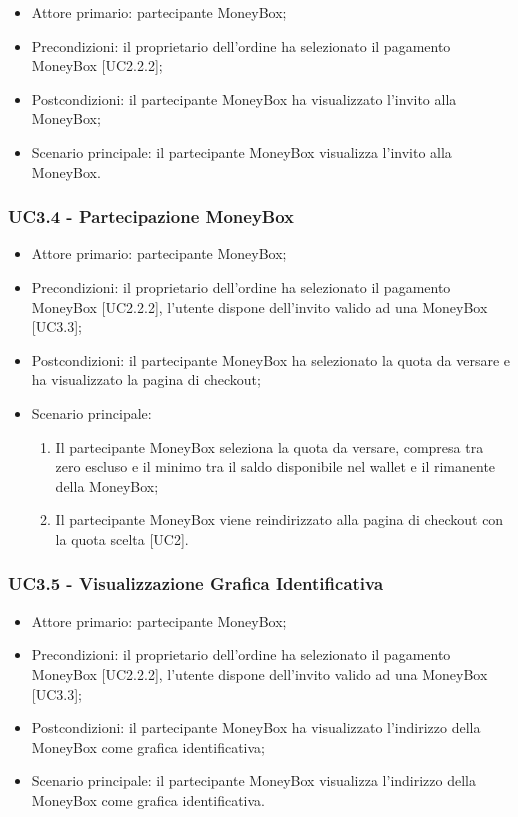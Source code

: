 \begin{itemize}
    \item Attore primario: partecipante MoneyBox\glo{};
    \item Precondizioni: il proprietario dell'ordine ha selezionato il pagamento MoneyBox\glo{} [UC2.2.2];
    \item Postcondizioni: il partecipante MoneyBox\glo{} ha visualizzato l'invito alla MoneyBox\glo{};
    \item Scenario principale: il partecipante MoneyBox\glo{} visualizza l'invito alla MoneyBox\glo{}.
\end{itemize}

\subsubsection{UC3.4 - Partecipazione MoneyBox}

\begin{itemize}
    \item Attore primario: partecipante MoneyBox\glo{};
    \item Precondizioni: il proprietario dell'ordine ha selezionato il pagamento MoneyBox\glo{} [UC2.2.2], 
            l'utente dispone dell'invito valido ad una MoneyBox\glo{} [UC3.3];
    \item Postcondizioni: il partecipante MoneyBox\glo{} ha selezionato la quota da versare e ha visualizzato la pagina di checkout;
    \item Scenario principale:
          \begin{enumerate}
              \item Il partecipante MoneyBox\glo{} seleziona la quota da versare, compresa tra zero escluso e il minimo tra il saldo disponibile nel wallet\glo{} 
                    e il rimanente della MoneyBox\glo{};
              \item Il partecipante MoneyBox\glo{} viene reindirizzato alla pagina di checkout con la quota scelta [UC2].
          \end{enumerate}
\end{itemize}

\subsubsection{UC3.5 - Visualizzazione Grafica Identificativa}

\begin{itemize}
    \item Attore primario: partecipante MoneyBox\glo{};
    \item Precondizioni: il proprietario dell'ordine ha selezionato il pagamento MoneyBox\glo{} [UC2.2.2], 
            l'utente dispone dell'invito valido ad una MoneyBox\glo{} [UC3.3];
    \item Postcondizioni: il partecipante MoneyBox\glo{} ha visualizzato l'indirizzo della MoneyBox\glo{} come grafica identificativa;
    \item Scenario principale: il partecipante MoneyBox\glo{} visualizza l'indirizzo della MoneyBox\glo{} come grafica identificativa.
\end{itemize}

